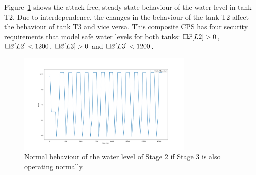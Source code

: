 {Figure~\ref{fig:CPSRobustness:Stage2Normal} shows the attack-free, steady state behaviour of the water level in tank T2. Due to interdependence, the changes in the behaviour of the tank T2 affect the behaviour of tank T3 and vice versa. This composite CPS has four security requirements that model safe water levels for both tanks: ${{\square}}{\vec{x}[L2]>0}$, ${{\square}}{\vec{x}[L2]<1200}$, ${{\square}}{\vec{x}[L3]>0}$ and ${{\square}}{\vec{x}[L3]<1200}$. 



\begin{figure}[t]
  \centering
  \includegraphics[width=0.75\textwidth]{Figures/Stage2Normal.png}
  \caption{Normal behaviour of the water level of Stage 2 if Stage 3 is also operating normally.}
  \label{fig:CPSRobustness:Stage2Normal}
\end{figure}

}
